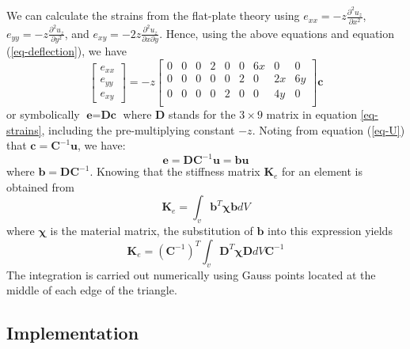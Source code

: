 \documentclass{llncs}
\begin{document}
We can calculate the strains from the flat-plate theory using $  e_{xx} = -z \frac{\partial^2u_z}{\partial x^2} $, $ e_{yy} = -z \frac{\partial^2u_z}{\partial y^2} $, and $ e_{xy} = -2z \frac{\partial^2u_z}{\partial x \partial y} $.  
Hence, using the above equations and equation (\ref{eq-deflection}), we have
\begin{equation}
\begin{bmatrix}
e_{xx} \\
e_{yy} \\
e_{xy}
\end{bmatrix}
= 
-z
\begin{bmatrix}
0 & 0 & 0 & 2 & 0 & 0 & 6x & 0 & 0 \\
0 & 0 & 0 & 0 & 0 & 2 & 0 & 2x & 6y \\
0 & 0 & 0 & 0 & 2 & 0 & 0 & 4y & 0 \\
\end{bmatrix}
\textbf{c}
\label{eq-strains}
\end{equation} 
or symbolically $\textbf{e} = \textbf{Dc}$ where $\textbf{D}$ stands for the $3\times 9$ matrix in equation \ref{eq-strains}, including the pre-multiplying constant $-z$. Noting from equation (\ref{eq-U}) that $\textbf{c} = \textbf{C}^{-1}\textbf{u}$, we have:
\begin{equation}
\textbf{e} = \textbf{DC}^{-1}\textbf{u} = \textbf{bu}
\end{equation} 
where $\textbf{b} = \textbf{DC}^{-1}$. 
Knowing that the stiffness matrix $\textbf{K}_e$ for an element is obtained from
\begin{equation}
\textbf{K}_e = \int_v \textbf{b}^{T} \boldsymbol\chi \textbf{b} dV
\end{equation} 
where $\boldsymbol\chi$ is the material matrix, the substitution of $\textbf{b}$ into this expression yields
\begin{equation}
\textbf{K}_e = (\textbf{C}^{-1})^T \int_v \textbf{D}^{T} \boldsymbol\chi \textbf{D} dV \textbf{C}^{-1}
\end{equation} 
The integration is carried out numerically using Gauss points located at the middle of each edge of the triangle. 

\subsection{Implementation}
\end{document}
